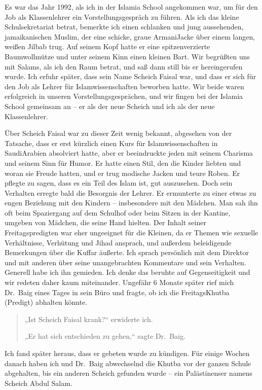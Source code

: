 \documentclass[12pt]{memoir}
\begin{document}
Es war das Jahr 1992, als ich in der Islamia School angekommen war,
um für den Job als Klassenlehrer ein Vorstellungsgespräch zu führen.
Als ich das kleine Schulsekretariat betrat,
bemerkte ich einen schlanken und jung aussehenden, jamaikanischen Muslim,
der eine schicke, graue Armani\–Jacke
über einem langen, weißen Jilbab trug.
Auf seinem Kopf hatte er eine spitzenverzierte Baumwollmütze
und unter seinem Kinn einen kleinen Bart.
Wir begrüßten uns mit Salams, als ich den Raum betrat,
und saß dann still bis er hereingerufen wurde.
Ich erfuhr später, dass sein Name Scheich Faisal war,
und dass er sich für den Job
als Lehrer für Islamwissenschaften beworben hatte.
Wir beide waren erfolgreich in unseren Vorstellungsgesprächen,
und wir fingen bei der Islamia School gemeinsam an –
er als der neue Scheich und ich als der neue Klassenlehrer.

Über Scheich Faisal war zu dieser Zeit wenig bekannt,
abgesehen von der Tatsache, dass er erst kürzlich einen Kurs
für Islamwissenschaften in Saudi\–Arabien absolviert hatte,
aber er beeindruckte jeden mit seinem Charisma und seinem Sinn für Humor.
Er hatte einen Stil, den die Kinder liebten und woran sie Freude hatten,
und er trug modische Jacken und teure Roben.
Er pflegte zu sagen, dass es ein Teil des Islam ist, gut auszusehen.
Doch sein Verhalten erregte bald die Besorgnis der Lehrer.
Er ermunterte zu einer etwas zu engen Beziehung mit den Kindern –
insbesondere mit den Mädchen.
Man sah ihn oft beim Spaziergang auf dem Schulhof
oder beim Sitzen in der Kantine,
umgeben von Mädchen, die seine Hand hielten.
Der Inhalt seiner Freitagspredigten war eher ungeeignet für die Kleinen,
da er Themen wie sexuelle Verhältnisse, Verhütung und Jihad ansprach,
und außerdem beleidigende Bemerkungen über die Kuffar äußerte.
Ich sprach persönlich mit dem Direktor und mit anderen
über seine unangebrachten Kommentare und sein Verhalten.
Generell habe ich ihn gemieden.
Ich denke das beruhte auf Gegenseitigkeit
und wir redeten daher kaum miteinander.
Ungefähr 6 Monate später rief mich Dr.\ Baig eines Tages in sein Büro
und fragte, ob ich die Freitags\–Khutba (Predigt) abhalten könnte.

\begin{quote}
„Ist Scheich Faisal krank?“ erwiderte ich.

„Er hat sich entschieden zu gehen,“ sagte Dr.\ Baig.
\end{quote}

Ich fand später heraus, dass er gebeten wurde zu kündigen.
Für einige Wochen danach
haben ich und Dr.\ Baig abwechselnd
die Khutba vor der ganzen Schule abgehalten,
bis ein anderen Scheich gefunden wurde –
ein Palästinenser namens Scheich Abdul Salam.
\end{document}
